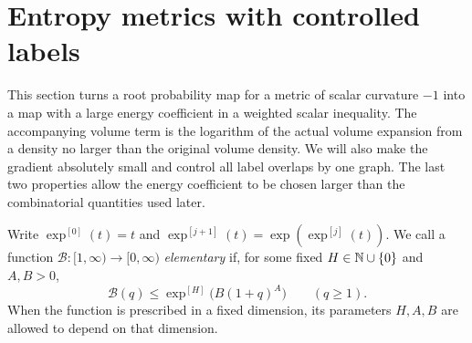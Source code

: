 \section{Entropy metrics with controlled labels}\label{sec:entropy}

This section turns a root probability map for a metric of scalar curvature
\(-1\) into a map with a large energy coefficient in a weighted scalar
inequality.  The accompanying volume term is the logarithm of the actual
volume expansion from a density no larger than the original volume density.
We will also make the gradient absolutely small and control all label
overlaps by one graph.  The last two properties allow the energy coefficient
to be chosen larger than the combinatorial quantities used later.

Write \(\exp^{[0]}(t)=t\) and
\(\exp^{[j+1]}(t)=\exp(\exp^{[j]}(t))\).  We call a function
\(\mathcal B:[1,\infty)\to[0,\infty)\) \emph{elementary} if, for some fixed
\(H\in\mathbb N\cup\{0\}\) and \(A,B>0\),
\[
 \mathcal B(q)\leq \exp^{[H]}\bigl(B(1+q)^A\bigr)\qquad(q\geq1).
\]
When the function is prescribed in a fixed dimension, its parameters
\(H,A,B\) are allowed to depend on that dimension.


